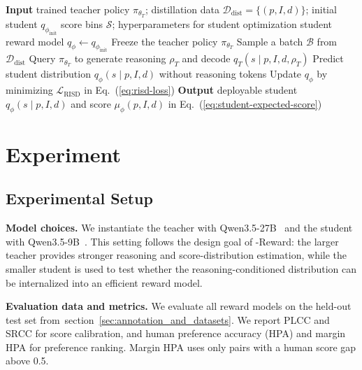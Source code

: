\documentclass{llmxive}
\providecommand{\mname}{\twemoji[width=0.75em]{zap}-Reward\xspace}
\providecommand{\stuname}{RISD\xspace}
\providecommand{\secref}[1]{section~\ref{#1}}
\begin{document}
\begin{algorithm}[t]
  \caption{Reasoning-Internalized Score Distillation (\stuname)}
  \label{alg:risd}
  \begin{algorithmic}[1]
    \Statex \textbf{Input} trained teacher policy $\pi_{\theta_T}$; distillation data $\mathcal{D}_{\mathrm{dist}}=\{(p,I,d)\}$; initial student $q_{\phi_{\mathrm{init}}}$
    \Statex \hspace{\algorithmicindent} score bins $\mathcal{S}$; hyperparameters for student optimization
    \State student reward model $q_\phi \gets q_{\phi_{\mathrm{init}}}$
    \State Freeze the teacher policy $\pi_{\theta_T}$
      \State Sample a batch $\mathcal{B}$ from $\mathcal{D}_{\mathrm{dist}}$
        \State Query $\pi_{\theta_T}$ to generate reasoning $\rho_T$ and decode $q_T(s\mid p,I,d,\rho_T)$
        \State Predict student distribution $q_\phi(s\mid p,I,d)$ without reasoning tokens
      \EndFor
      \State Update $q_\phi$ by minimizing $\mathcal{L}_{\mathrm{RISD}}$ in Eq.~(\ref{eq:risd-loss})
    \EndFor
    \Statex \textbf{Output} deployable student $q_\phi(s\mid p,I,d)$ and score $\mu_\phi(p,I,d)$ in Eq.~(\ref{eq:student-expected-score})
  \end{algorithmic}
\end{algorithm}


\section{Experiment}

\subsection{Experimental Setup}

\textbf{Model choices.} We instantiate the teacher with Qwen3.5-27B~\cite{qwen3.5} and the student with Qwen3.5-9B~\cite{qwen3.5}. This setting follows the design goal of \mname: the larger teacher provides stronger reasoning and score-distribution estimation, while the smaller student is used to test whether the reasoning-conditioned distribution can be internalized into an efficient reward model.




\textbf{Evaluation data and metrics.} We evaluate all reward models on the held-out test set from~\secref{sec:annotation_and_datasets}. We report PLCC and SRCC for score calibration, and human preference accuracy (HPA) and margin HPA for preference ranking. Margin HPA uses only pairs with a human score gap above 0.5.
\end{document}
